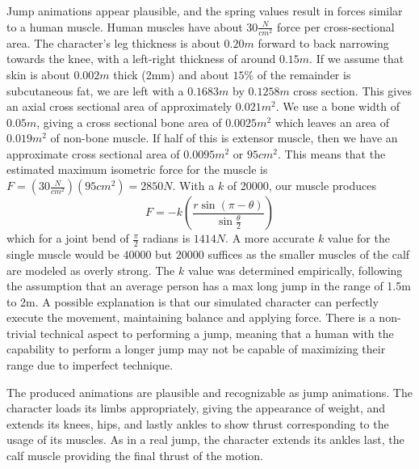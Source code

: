 Jump animations appear plausible, and the spring values result in forces similar to a human muscle.  Human muscles have about $30\frac{N}{cm^2}$ force per cross-sectional area.\cite{biomech_sport}  The character's leg thickness is about $0.20m$ forward to back narrowing towards the knee, with a left-right thickness of around $0.15m$. If we assume that skin is about $0.002m$ thick (2mm) and about $15\%$ of the remainder is subcutaneous fat, we are left with a $0.1683m$ by $0.1258m$ cross section.  This gives an axial cross sectional area of approximately $0.021m^2$.  We use a bone width of $0.05m$, giving a cross sectional bone area of $0.0025m^2$ which leaves an area of $0.019m^2$ of non-bone muscle.  If half of this is extensor muscle, then we have an approximate cross sectional area of $0.0095m^2$ or $95cm^2$.  This means that the estimated maximum isometric force for the muscle is $F = \left(30 \frac{N}{cm^2}\right) \left(95cm^2\right) = 2850N$.  With a $k$ of 20000, our muscle produces \[
	F = -k \left(\dfrac{r \sin (\pi - \theta)}{\sin \frac{\theta}{2}} \right)
\]
which for a joint bend of $\frac{\pi}{2}$ radians is $1414N$.  A more accurate $k$ value for the single muscle would be $40000$ but $20000$ suffices as the smaller muscles of the calf are modeled as overly strong.  The $k$ value was determined empirically, following the assumption that an average person has a max long jump in the range of 1.5m to 2m.  A possible explanation is that our simulated character can perfectly execute the movement, maintaining balance and applying force.  There is a non-trivial technical aspect to performing a jump, meaning that a human with the capability to perform a longer jump may not be capable of maximizing their range due to imperfect technique.

The produced animations are plausible and recognizable as jump animations.  The character loads its limbs appropriately, giving the appearance of weight, and extends its knees, hips, and lastly ankles to show thrust corresponding to the usage of its muscles.  As in a real jump, the character extends its ankles last, the calf muscle providing the final thrust of the motion.

